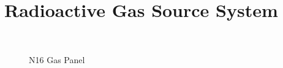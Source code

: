 \chapter{Radioactive Gas Source System}




\begin{figure}
\begin{center}
\leavevmode
\epsfxsize=7in
~\\
\caption[N16 Gas Panel]
        {N16 Gas Panel
        } 
        
\end{center}
\end{figure}


